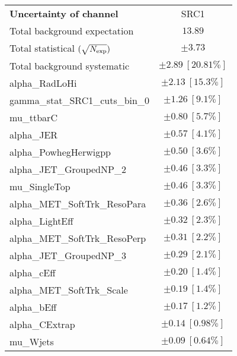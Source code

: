 
\begin{table}
\begin{center}
\setlength{\tabcolsep}{0.0pc}
\begin{tabular*}{\textwidth}{@{\extracolsep{\fill}}lc}
\noalign{\smallskip}\hline\noalign{\smallskip}
{\bf Uncertainty of channel}                                    & SRC1            \\
\noalign{\smallskip}\hline\noalign{\smallskip}
Total background expectation             &  $13.89$       \\
\noalign{\smallskip}\hline\noalign{\smallskip}
Total statistical $(\sqrt{N_{\rm exp}})$              & $\pm 3.73$       \\
Total background systematic               & $\pm 2.89\ [20.81\%] $             \\
\noalign{\smallskip}\hline\noalign{\smallskip}
\noalign{\smallskip}\hline\noalign{\smallskip}
alpha\_RadLoHi         & $\pm 2.13\ [15.3\%] $       \\
gamma\_stat\_SRC1\_cuts\_bin\_0         & $\pm 1.26\ [9.1\%] $       \\
mu\_ttbarC         & $\pm 0.80\ [5.7\%] $       \\
alpha\_JER         & $\pm 0.57\ [4.1\%] $       \\
alpha\_PowhegHerwigpp         & $\pm 0.50\ [3.6\%] $       \\
alpha\_JET\_GroupedNP\_2         & $\pm 0.46\ [3.3\%] $       \\
mu\_SingleTop         & $\pm 0.46\ [3.3\%] $       \\
alpha\_MET\_SoftTrk\_ResoPara         & $\pm 0.36\ [2.6\%] $       \\
alpha\_LightEff         & $\pm 0.32\ [2.3\%] $       \\
alpha\_MET\_SoftTrk\_ResoPerp         & $\pm 0.31\ [2.2\%] $       \\
alpha\_JET\_GroupedNP\_3         & $\pm 0.29\ [2.1\%] $       \\
alpha\_cEff         & $\pm 0.20\ [1.4\%] $       \\
alpha\_MET\_SoftTrk\_Scale         & $\pm 0.19\ [1.4\%] $       \\
alpha\_bEff         & $\pm 0.17\ [1.2\%] $       \\
alpha\_CExtrap         & $\pm 0.14\ [0.98\%] $       \\
mu\_Wjets         & $\pm 0.09\ [0.64\%] $       \\

\end{tabular*}
\end{center}
\end{table}
